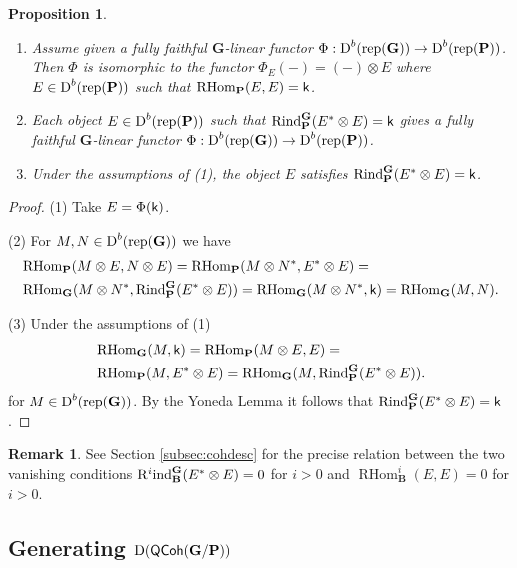 \documentclass[sn-mathphys-num]{sn-jnl}%
\newcommand{\rep}{{\mathrm{rep}}}
\newcommand{\ind}{{\mathrm{ind}}}
\newcommand{\Rind}{{\mathrm{Rind}}}
\newcommand*{\Dd}{\mathop{\mathrm D\kern0pt}\nolimits}
\newcommand*{\RHom}{\mathop{\mathrm {RHom}}\nolimits}
\newcommand{\QCoh}{\mathsf{QCoh}}
\newcommand{\sk}{{\sf k}}
\newcommand{\bg}{\mathbf G}
\newcommand{\fb}{\mathbf B}
\newcommand{\bp}{\mathbf P}
\newtheorem{proposition}[theorem]{Proposition}
\theoremstyle{definition}
\newtheorem{remark}[theorem]{Remark}
\begin{document}
\begin{proposition}\label{prop:G-linear_exceptional}
\
\begin{enumerate}
\item Assume given a fully faithful $ \bg$-linear functor $\Phi: \Dd ^b(\rep( \bg))\rightarrow \Dd ^b(\rep( \bp))$. Then $\Phi$ is isomorphic to the functor $\Phi _E(-)=(-)\otimes E$ where $E\in \Dd ^b(\rep( \bp))$ such that $\RHom _{ \bp}(E,E)=\sk$.

\item Each object $E\in \Dd ^b(\rep( \bp))$ such that $\Rind_{ \bp}^{ \bg}(E^{\ast}\otimes E)=\sk$ gives a fully faithful $ \bg$-linear functor $\Phi: \Dd ^b(\rep( \bg))\rightarrow \Dd ^b(\rep( \bp))$. 

\item Under the assumptions of (1), the object $E$ satisfies $\Rind_{ \bp}^{ \bg}(E^{\ast}\otimes E)=\sk$.
\end{enumerate}

\end{proposition}
\begin{proof}
(1) Take $E=\Phi(\sk)$.

(2) For $M,N\in \Dd ^b(\rep( \bg))$ we have
\begin{eqnarray*}& \RHom _{ \bp}(M\otimes E,N\otimes E)=\RHom_\bp(M\otimes N^\ast,E^\ast\otimes E)=\\
&\RHom_\bg(M\otimes N^\ast,\Rind_\bp^\bg( E^\ast\otimes E))=\RHom_\bg(M\otimes N^\ast,\sk)=
\RHom_\bg(M,N).
\end{eqnarray*}

(3) Under the assumptions of (1)
\begin{eqnarray*}&\RHom _{ \bg}( M, \sk)=\RHom_\bp(M\otimes E, E)=\\&\RHom_\bp(M, E^\ast\otimes E)=\RHom_\bg(M,\Rind_\bp^\bg( E^\ast\otimes E)).
\end{eqnarray*}
for $M\in \Dd^b(\rep(\bg))$. By the Yoneda Lemma it follows that $\Rind_{ \bp}^{ \bg}(E^{\ast}\otimes E)=\sk$.
\end{proof}
\begin{remark}\label{rem:ind-to-B-exceptional}
See Section \ref{subsec:cohdesc} for the precise relation between the two vanishing conditions ${\rm R}^{i}\ind_{\fb}^{ \bg}(E^{\ast}\otimes E)=0$ for $i>0$ and $\RHom ^{i} _{\fb}(E,E)=0$ for $i>0$.
\end{remark}


\subsection{Generating $\Dd ({\QCoh}(\bg/\bp))$}\label{subsec:generatingG/P}
\end{document}
